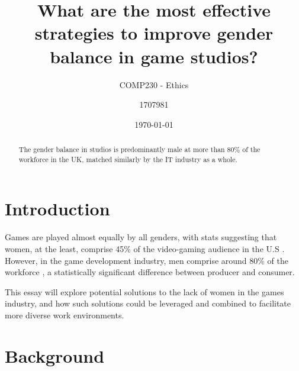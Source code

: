 \documentclass{scrartcl}
\title{What are the most effective strategies to improve gender balance in game studios?}
\subtitle{COMP230 - Ethics}
\date{\today}
\author{1707981}
\begin{document}
\maketitle
{}








\begin{abstract}
The gender balance in studios is predominantly male at more than 80\% of the workforce in the UK, matched similarly by the IT industry as a whole. 
\end{abstract}

\section{Introduction}
Games are played almost equally by all genders, with stats suggesting that women, at the least, comprise 45\% of the video-gaming audience in the U.S \cite{duggan_gaming_2015, noauthor_essential_2018}. However, in the game development industry, men comprise around 80\% of the workforce \cite{igda_satisfaction_2017}, a statistically significant difference between producer and consumer.

This essay will explore potential solutions to the lack of women in the games industry, and how such solutions could be leveraged and combined to facilitate more diverse work environments.

\section{Background}
\end{document}
